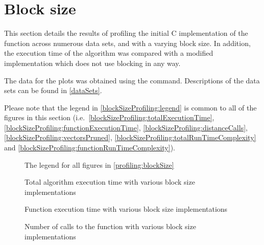 


\section{Block size}
\label{profiling:blockSize}
This section details the results of profiling the initial C implementation of
the  function across numerous data sets, and
with a varying block size. In addition, the execution time of the algorithm was
compared with a modified implementation which does not use blocking in any way.

The data for the plots was obtained using the 
 command. Descriptions of the data sets can be found in
\autoref{dataSets}.


Please note that the legend in \autoref{blockSizeProfiling:legend} is common to
all of the figures in this section (i.e.\
\autoref{blockSizeProfiling:totalExecutionTime},
\autoref{blockSizeProfiling:functionExecutionTime},
\autoref{blockSizeProfiling:distanceCalls},
\autoref{blockSizeProfiling:vectorsPruned},
\autoref{blockSizeProfiling:totalRunTimeComplexity} and
\autoref{blockSizeProfiling:functionRunTimeComplexity}).

\begin{figure}[H]
    \centering
    
    \caption[Block size profiling legend]
        {The legend for all figures in \autoref{profiling:blockSize}}
    \label{blockSizeProfiling:legend}
\end{figure}

\begin{figure}[H]
    \centering
    
    \caption{Total algorithm execution time with various block size
        implementations}
    \label{blockSizeProfiling:totalExecutionTime}
\end{figure}

\begin{figure}[H]
    \centering
    
    \caption{Function execution time with various block size implementations}
    \label{blockSizeProfiling:functionExecutionTime}
\end{figure}

\begin{figure}[H]
    \centering
    
    \caption{Number of calls to the  function with various
        block size implementations}
    \label{blockSizeProfiling:distanceCalls}
\end{figure}

